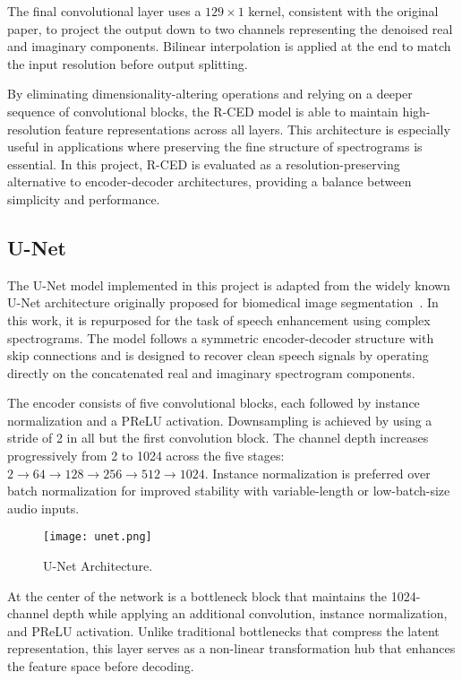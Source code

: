 The final convolutional layer uses a \(129 \times 1\) kernel, consistent with the original paper, to project the output down to two channels representing the denoised real and imaginary components. Bilinear interpolation is applied at the end to match the input resolution before output splitting.

By eliminating dimensionality-altering operations and relying on a deeper sequence of convolutional blocks, the R-CED model is able to maintain high-resolution feature representations across all layers. This architecture is especially useful in applications where preserving the fine structure of spectrograms is essential. In this project, R-CED is evaluated as a resolution-preserving alternative to encoder-decoder architectures, providing a balance between simplicity and performance.

\subsection{U-Net}
\label{sec:unet}

The U-Net model implemented in this project is adapted from the widely known U-Net architecture originally proposed for biomedical image segmentation~\cite{ronneberger2015unet}. In this work, it is repurposed for the task of speech enhancement using complex spectrograms. The model follows a symmetric encoder-decoder structure with skip connections and is designed to recover clean speech signals by operating directly on the concatenated real and imaginary spectrogram components.

The encoder consists of five convolutional blocks, each followed by instance normalization and a PReLU activation. Downsampling is achieved by using a stride of 2 in all but the first convolution block. The channel depth increases progressively from 2 to 1024 across the five stages: \(2 \rightarrow 64 \rightarrow 128 \rightarrow 256 \rightarrow 512 \rightarrow 1024\). Instance normalization is preferred over batch normalization for improved stability with variable-length or low-batch-size audio inputs.

\begin{figure}[h]
    \centering
    \texttt{[image: unet.png]}
    \caption{\label{fig:unet}U-Net Architecture.}
\end{figure}

At the center of the network is a bottleneck block that maintains the 1024-channel depth while applying an additional convolution, instance normalization, and PReLU activation. Unlike traditional bottlenecks that compress the latent representation, this layer serves as a non-linear transformation hub that enhances the feature space before decoding.

